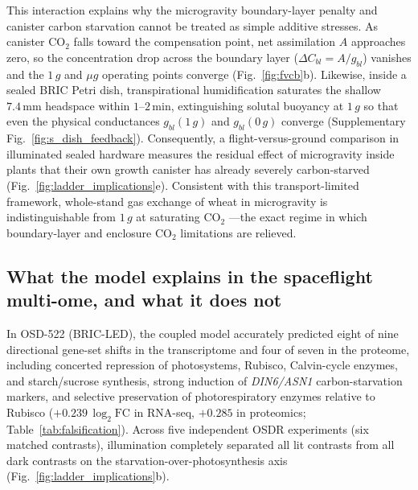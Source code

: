 \documentclass[final,5p,times,twocolumn,numbers,sort&compress]{elsarticle}
\begin{document}
This interaction explains why the microgravity boundary-layer penalty and canister carbon starvation cannot be treated as simple additive stresses. As canister $\mathrm{CO_2}$ falls toward the compensation point, net assimilation $A$ approaches zero, so the concentration drop across the boundary layer ($\Delta C_{bl} = A/g_{bl}$) vanishes and the $1\,g$ and $\mu g$ operating points converge (Fig.~\ref{fig:fvcb}b). Likewise, inside a sealed BRIC Petri dish, transpirational humidification saturates the shallow $7.4\,\mathrm{mm}$ headspace within $1\text{--}2\,\mathrm{min}$, extinguishing solutal buoyancy at $1\,g$ so that even the physical conductances $g_{bl}(1\,g)$ and $g_{bl}(0\,g)$ converge (Supplementary Fig.~\ref{fig:s_dish_feedback}). Consequently, a flight-versus-ground comparison in illuminated sealed hardware measures the residual effect of microgravity inside plants that their own growth canister has already severely carbon-starved (Fig.~\ref{fig:ladder_implications}e). Consistent with this transport-limited framework, whole-stand gas exchange of wheat in microgravity is indistinguishable from $1\,g$ at saturating $\mathrm{CO_2}$ \citep{monje2005}---the exact regime in which boundary-layer and enclosure $\mathrm{CO_2}$ limitations are relieved.

\subsection{What the model explains in the spaceflight multi-ome, and what it does not}

In OSD-522 (BRIC-LED), the coupled model accurately predicted eight of nine directional gene-set shifts in the transcriptome and four of seven in the proteome, including concerted repression of photosystems, Rubisco, Calvin-cycle enzymes, and starch/sucrose synthesis, strong induction of \textit{DIN6/ASN1} carbon-starvation markers, and selective preservation of photorespiratory enzymes relative to Rubisco ($+0.239\,\log_2\mathrm{FC}$ in RNA-seq, $+0.285$ in proteomics; Table~\ref{tab:falsification}). Across five independent OSDR experiments (six matched contrasts), illumination completely separated all lit contrasts from all dark contrasts on the starvation-over-photosynthesis axis (Fig.~\ref{fig:ladder_implications}b).
\end{document}
